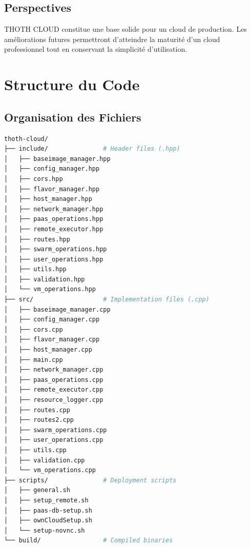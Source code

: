 \documentclass[12pt,a4paper]{article}
\begin{document}
\subsection{Perspectives}

THOTH CLOUD constitue une base solide pour un cloud de production. Les améliorations futures permettront d'atteindre la maturité d'un cloud professionnel tout en conservant la simplicité d'utilisation.

\vspace{1cm}

\begin{center}
\end{center}

\appendix

\section{Structure du Code}

\subsection{Organisation des Fichiers}

\begin{lstlisting}[language=bash, caption=Arborescence du projet]
thoth-cloud/
├── include/               # Header files (.hpp)
│   ├── baseimage_manager.hpp
│   ├── config_manager.hpp
│   ├── cors.hpp
│   ├── flavor_manager.hpp
│   ├── host_manager.hpp
│   ├── network_manager.hpp
│   ├── paas_operations.hpp
│   ├── remote_executor.hpp
│   ├── routes.hpp
│   ├── swarm_operations.hpp
│   ├── user_operations.hpp
│   ├── utils.hpp
│   ├── validation.hpp
│   └── vm_operations.hpp
├── src/                   # Implementation files (.cpp)
│   ├── baseimage_manager.cpp
│   ├── config_manager.cpp
│   ├── cors.cpp
│   ├── flavor_manager.cpp
│   ├── host_manager.cpp
│   ├── main.cpp
│   ├── network_manager.cpp
│   ├── paas_operations.cpp
│   ├── remote_executor.cpp
│   ├── resource_logger.cpp
│   ├── routes.cpp
│   ├── routes2.cpp
│   ├── swarm_operations.cpp
│   ├── user_operations.cpp
│   ├── utils.cpp
│   ├── validation.cpp
│   └── vm_operations.cpp
├── scripts/               # Deployment scripts
│   ├── general.sh
│   ├── setup_remote.sh
│   ├── paas-db-setup.sh
│   ├── ownCloudSetup.sh
│   └── setup-novnc.sh
└── build/                 # Compiled binaries
\end{lstlisting}
\end{document}
